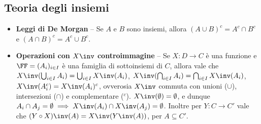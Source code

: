 \begin{multicols*}{2}
\section*{Teoria degli insiemi}

\begin{itemize}
    \item \textbf{Leggi di De Morgan} -- Se $A$ e $B$ sono insiemi, allora
    $(A \cup B)^c = A^c \cap B^c$ e $(A \cap B)^c = A^c \cup B^c$.
    \item \textbf{Operazioni con $X\inv$ controimmagine} -- Se $X : D \to C$ è
    una funzione e $\FF = (A_i)_{i \in I}$ è una famiglia di sottoinsiemi di $C$, allora vale che $X\inv(\bigcup_{i \in I} A_i) = \bigcup_{i \in I} X\inv(A_i)$,
    $X\inv(\bigcap_{i \in I} A_i) = \bigcap_{i \in I} X\inv(A_i)$,
    $X\inv(A_i^c) = X\inv(A_i)^c$, ovverosia $X\inv$ commuta con unioni ($\cup$),
    intersezioni ($\cap$) e complementare ($^c$). $X\inv(\emptyset) = \emptyset$, e dunque $A_i \cap A_j = \emptyset \implies X\inv(A_i) \cap X\inv(A_j) = \emptyset$.
    Inoltre per $Y : C \to C'$ vale che $(Y \circ X)\inv(A) = X\inv(Y\inv(A))$,
    per $A \subseteq C'$.
\end{itemize}

\end{multicols*}